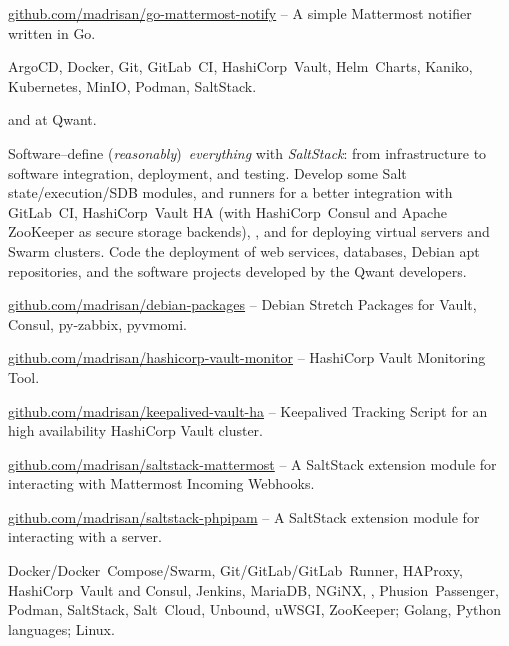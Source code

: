 \smallskip\noindent
\software
\url{github.com/madrisan/go-mattermost-notify} --
A simple Mattermost notifier written in Go.

\smallskip\noindent
\technologies
ArgoCD, Docker, Git, GitLab~CI, HashiCorp~Vault, Helm~Charts, Kaniko,
Kubernetes, MinIO, Podman, SaltStack.




 and  at Qwant.

\smallskip\noindent
\tasks
Software--define ({\it reasonably}\/)~{\it everything\/} with {\it SaltStack\/}:
from infrastructure to software integration, deployment, and testing.
Develop some Salt state/execution/SDB modules, and runners for a better
integration with GitLab~CI, HashiCorp~Vault HA (with HashiCorp~Consul and
Apache ZooKeeper as secure storage backends), \phpIPAM{}, and for deploying
virtual servers and Swarm clusters.
Code the deployment of web services, databases, Debian apt repositories, and the
software projects developed by the Qwant developers.

\smallskip\noindent
\software
\url{github.com/madrisan/debian-packages} --
Debian Stretch Packages for Vault, Consul, py-zabbix, pyvmomi.

\noindent
\url{github.com/madrisan/hashicorp-vault-monitor} --
HashiCorp Vault Monitoring Tool.

\noindent
\url{github.com/madrisan/keepalived-vault-ha} --
Keepalived Tracking Script for an high availability HashiCorp Vault cluster.

\noindent
\url{github.com/madrisan/saltstack-mattermost} --
A SaltStack extension module for interacting with Mattermost Incoming Webhooks.

\noindent
\url{github.com/madrisan/saltstack-phpipam} --
A SaltStack extension module for interacting with a \phpIPAM{} server.


\smallskip\noindent
\technologies
Docker/Docker~Compose/Swarm, Git/GitLab/GitLab~Runner, HAProxy,
HashiCorp~Vault and Consul, Jenkins, MariaDB, NGiNX, \phpIPAM,
Phusion~Passenger, Podman, SaltStack, Salt~Cloud, Unbound, uWSGI, ZooKeeper;
Golang, Python languages; Linux.

